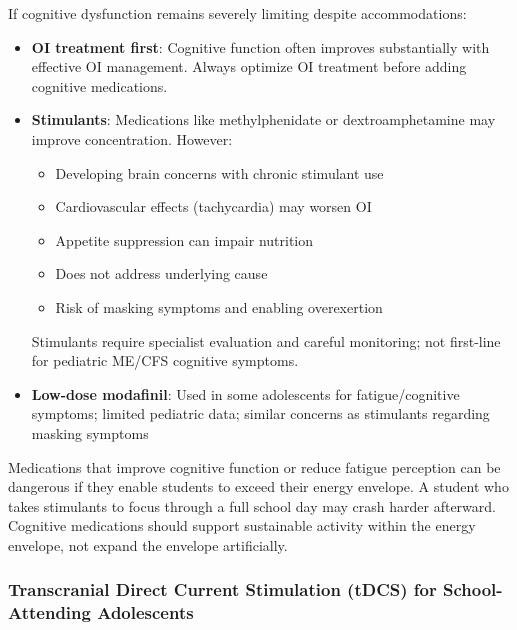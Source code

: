 If cognitive dysfunction remains severely limiting despite accommodations:

\begin{itemize}
    \item \textbf{OI treatment first}: Cognitive function often improves substantially with effective OI management. Always optimize OI treatment before adding cognitive medications.

    \item \textbf{Stimulants}: Medications like methylphenidate or dextroamphetamine may improve concentration. However:
    \begin{itemize}
        \item Developing brain concerns with chronic stimulant use
        \item Cardiovascular effects (tachycardia) may worsen OI
        \item Appetite suppression can impair nutrition
        \item Does not address underlying cause
        \item Risk of masking symptoms and enabling overexertion
    \end{itemize}
    Stimulants require specialist evaluation and careful monitoring; not first-line for pediatric ME/CFS cognitive symptoms.

    \item \textbf{Low-dose modafinil}: Used in some adolescents for fatigue/cognitive symptoms; limited pediatric data; similar concerns as stimulants regarding masking symptoms
\end{itemize}

\begin{practicalwarning}
Medications that improve cognitive function or reduce fatigue perception can be dangerous if they enable students to exceed their energy envelope. A student who takes stimulants to focus through a full school day may crash harder afterward. Cognitive medications should support sustainable activity within the energy envelope, not expand the envelope artificially.
\end{practicalwarning}

\subsubsection{Transcranial Direct Current Stimulation (tDCS) for School-Attending Adolescents}

